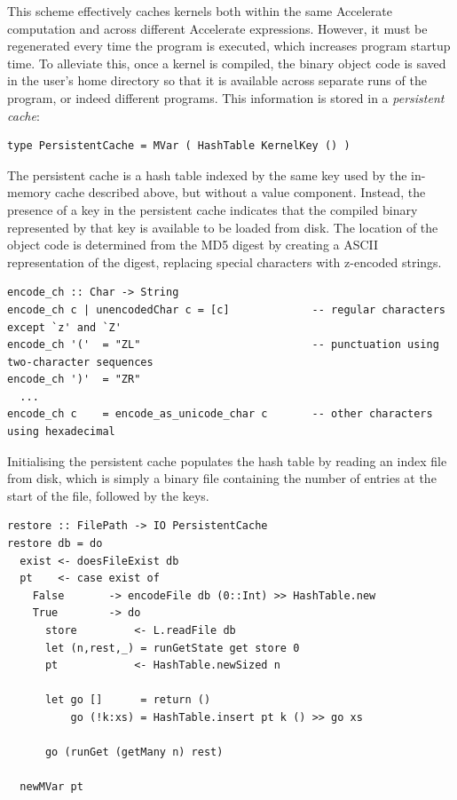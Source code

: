 This scheme effectively caches kernels both within the same Accelerate
computation and across different Accelerate expressions. However, it must be
regenerated every time the program is executed, which increases program startup
time. To alleviate this, once a kernel is compiled, the binary object code is
saved in the user's home directory so that it is available across separate runs
of the program, or indeed different programs. This information is stored in a
\emph{persistent cache}:
%
\begin{lstlisting}[style=haskell,numbers=none]
type PersistentCache = MVar ( HashTable KernelKey () )
\end{lstlisting}

The persistent cache is a hash table indexed by the same key used by the
in-memory cache described above, but without a value component. Instead, the
presence of a key in the persistent cache indicates that the compiled binary
represented by that key is available to be loaded from disk. The location of the
object code is determined from the MD5 digest by creating a ASCII representation
of the digest, replacing special characters with z-encoded strings.
%
\begin{lstlisting}[style=haskell]
encode_ch :: Char -> String
encode_ch c | unencodedChar c = [c]             -- regular characters except `z' and `Z'
encode_ch '('  = "ZL"                           -- punctuation using two-character sequences
encode_ch ')'  = "ZR"
  ...
encode_ch c    = encode_as_unicode_char c       -- other characters using hexadecimal
\end{lstlisting}

Initialising the persistent cache populates the hash table by reading an index
file from disk, which is simply a binary file containing the number of entries
at the start of the file, followed by the keys.
%
\begin{lstlisting}[style=haskell]
restore :: FilePath -> IO PersistentCache
restore db = do
  exist <- doesFileExist db
  pt    <- case exist of
    False       -> encodeFile db (0::Int) >> HashTable.new
    True        -> do
      store         <- L.readFile db
      let (n,rest,_) = runGetState get store 0
      pt            <- HashTable.newSized n

      let go []      = return ()
          go (!k:xs) = HashTable.insert pt k () >> go xs

      go (runGet (getMany n) rest)

  newMVar pt
\end{lstlisting}

